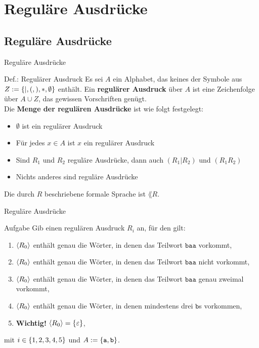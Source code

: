 \section{Reguläre Ausdrücke}
\subsection{Reguläre Ausdrücke}

\begin{frame}{Reguläre Ausdrücke}
\begin{block}{Def.: Regulärer Ausdruck}
	Es sei $A$ ein Alphabet, das keines der Symbole aus $Z := \left\{ \mid, (, ), *, \emptyset \right\}$ enthält.
	Ein \textbf{regulärer Ausdruck} über $A$ ist eine Zeichenfolge über $A \cup Z$, das gewissen Vorschriften genügt.\\
	Die \textbf{Menge der regulären Ausdrücke} ist wie folgt festgelegt:
	\begin{itemize}
		\item $\emptyset$ ist ein regulärer Ausdruck
		\item Für jedes $x \in A$ ist $x$ ein regulärer Ausdruck
		\item Sind $R_1$ und $R_2$ reguläre Ausdrücke, dann auch $(R_1 | R_2 )$ und $(R_1R_2)$
		\item Nichts anderes sind reguläre Ausdrücke
	\end{itemize}
	Die durch $R$ beschriebene formale Sprache ist $\lang{R}$.
\end{block}
\end{frame}

\begin{frame}{Reguläre Ausdrücke}
\begin{exampleblock}{Aufgabe}
	Gib einen regulären Ausdruck $R_i$ an, für den gilt:
	\begin{enumerate}
		\item $\lang{R_\theenumi}$ enthält genau die Wörter, in denen das Teilwort $\texttt{baa}$ vorkommt,
		\item $\lang{R_\theenumi}$ enthält genau die Wörter, in denen das Teilwort $\texttt{baa}$ nicht vorkommt,
		\item $\lang{R_\theenumi}$ enthält genau die Wörter, in denen das Teilwort $\texttt{baa}$ genau zweimal vorkommt,
		\item $\lang{R_\theenumi}$ enthält genau die Wörter, in denen mindestens drei $\texttt{b}$s vorkommen,
		\item \textbf{Wichtig!} $\lang{R_\theenumi} = \set{\varepsilon}$,
	\end{enumerate}
	mit $i \in \left\{ 1,2,3,4,5 \right\}$ und $A := \left\{ \texttt{a}, \texttt{b} \right\}$.
\end{exampleblock}
\end{frame}

